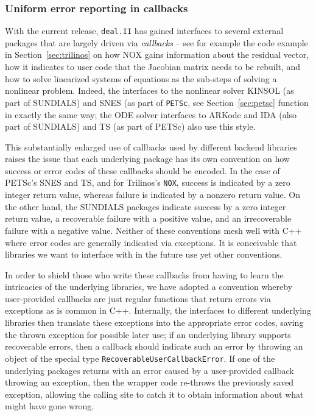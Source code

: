 \documentclass{ansarticle-preprint}
\newcommand{\specialword}[1]{\texttt{#1}}
\newcommand{\dealii}{{\specialword{deal.II}}\xspace}
\begin{document}
\subsubsection{Uniform error reporting in callbacks}\label{sec:callbacks}

With the current release, \dealii{} has gained interfaces to several
external packages that are largely driven via \textit{callbacks} --
see for example the code example in Section~\ref{sec:trilinos} on how
NOX gains information about the residual vector, how it indicates to
user code that the Jacobian matrix needs to be rebuilt,
and how to solve linearized systems of equations as the sub-steps of
solving a nonlinear problem. Indeed, the interfaces to the nonlinear
solver KINSOL (as part of SUNDIALS) and SNES (as part of \texttt{PETSc}, see
Section~\ref{sec:petsc} function in exactly the same way; the
ODE solver interfaces to ARKode and IDA (also part of SUNDIALS) and TS
(as part of PETSc) also use this style.

This substantially enlarged use of callbacks used by different backend
libraries raises the issue that each underlying package has its own
convention on how success or error codes of these callbacks should be
encoded. In the case of PETSc's SNES and TS, and for Trilinos's \texttt{NOX},
success is indicated by a zero integer return value, whereas failure is
indicated by a nonzero return value. On the other hand, the SUNDIALS
packages indicate success by a zero integer return value, a
recoverable failure with a positive value, and an irrecoverable failure
with a negative value. Neither of these conventions mesh well with C++
where error codes are generally indicated via exceptions.
It is conceivable that libraries we want to
interface with in the future use yet other conventions.

In order to shield those who write these callbacks from having to
learn the intricacies of the underlying libraries, we have adopted a
convention whereby user-provided callbacks are just regular functions
that return errors via exceptions as is common in C++. Internally, the
interfaces to different underlying libraries then translate these
exceptions into the appropriate error codes, saving the thrown exception for possible
later use; if an underlying library supports
recoverable errors, then a callback should indicate such an error by
throwing an object of the special type
\texttt{RecoverableUserCallbackError}. If one of the underlying
packages returns with an error caused by a user-provided callback
throwing an exception, then the wrapper code re-throws the previously
saved exception, allowing the calling site to catch it to obtain information
about what might have gone wrong.
\end{document}
